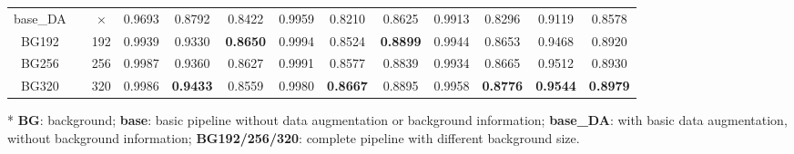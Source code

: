 \documentclass[letterpaper, 10 pt, conference]{ieeeconf}  %
\begin{document}
\begin{table}
\begin{threeparttable}
\begin{tabular}{ccc|ccc|ccc|ccc!{\color{black}\vrule}c}
			base\_DA               & \checkmark                          & $\times$                          & 0.9693 & {}0.8792          & {}0.8422              & 0.9959 & {}0.8210          & {}0.8625          & 0.9913 & {}0.8296              & {}0.9119              & {}0.8578           \\
			BG192                  & \checkmark                          & 192                         & 0.9939 & {}0.9330          & {}\textbf{0.8650}  & 0.9994 & {}0.8524           & {}\textbf{0.8899}  & 0.9944 & {}0.8653           & {}0.9468            & {}0.8920           \\
			BG256                  & \checkmark                          & 256                         & 0.9987 & {}0.9360          & {}0.8627          & 0.9991 & {}0.8577          & {}0.8839           & 0.9934 & {}0.8665           & {}0.9512          & {}0.8930           \\
			BG320                  & \checkmark                          & 320                         & 0.9986 & {}\textbf{0.9433}  & {}0.8559          & 0.9980 & {}\textbf{0.8667}  & {}0.8895           & 0.9958 & {}\textbf{0.8776}  & {}\textbf{0.9544}  & {}\textbf{0.8979}   \\
			\hline
		\end{tabular}
		\begin{tablenotes}
			\footnotesize
			\item[*] \textbf{BG}: background; \textbf{base}: basic pipeline without data augmentation or background information; \textbf{base\_DA}: with basic data augmentation, without background information; \textbf{BG192/256/320}: complete pipeline with different background size.
		\end{tablenotes}
	\end{threeparttable}
\end{table}
\end{document}
